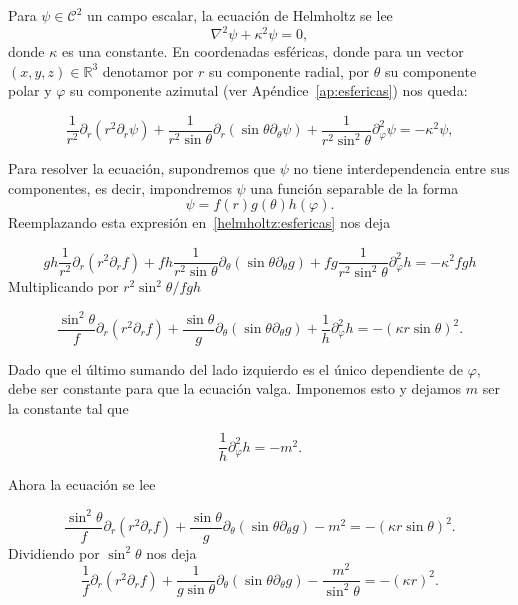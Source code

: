 \documentclass[11pt]{article}
\numberwithin{equation}{section}
\def\R{\mathbb{R}}
\def\Cc{\mathcal{C}}
\begin{document}
Para \(\psi \in \Cc^2\) un campo escalar, la ecuación
de Helmholtz se lee
\begin{equation}
\label{helmholtz}
	\nabla^2 \psi + \kappa^2 \psi = 0
,\end{equation}
donde \(\kappa\) es una constante. En coordenadas esféricas, donde para un
vector \((x,y,z)\in \R^3\) denotamor por \(r\) su componente radial, por 
\(\theta\) su componente polar y \(\varphi\) su componente azimutal 
(ver Apéndice~\ref{ap:esfericas}) nos queda:

\begin{equation}\label{helmholtz:esfericas}
	\frac{1}{r^2} \partial_{r} \left(r^2 \partial_{r} \psi\right)
	+
	\frac{1}{r^2\sin\theta} \partial_{r} \left(\sin\theta \partial_{\theta} \psi\right)
	+
	\frac{1}{r^2\sin^2\theta} \partial^2_{\varphi} \psi
	=
	-\kappa^2 \psi
,\end{equation}

Para resolver la ecuación, supondremos que \(\psi\) no tiene interdependencia
entre sus componentes, es decir, impondremos \(\psi\) una función separable de la forma
\begin{equation}
	\psi = f(r) g(\theta) h(\varphi).
\end{equation}
Reemplazando esta expresión en~\eqref{helmholtz:esfericas} nos deja

\begin{displaymath}
	gh \frac{1}{r^2} \partial_{r} \left(r^2 \partial_{r} f\right)
	+
	fh \frac{1}{r^2 \sin\theta} \partial_{\theta} \left(\sin\theta
	\partial_{\theta} g\right)
	+
	fg \frac{1}{r^2\sin^2\theta} \partial^2_{\varphi} h
	=
	-\kappa^2 fgh
\end{displaymath}
Multiplicando por \(r^2 \sin^2\theta/fgh\)

\begin{displaymath}
	\frac{\sin^2\theta}{f} \partial_{r} \left(r^2 \partial_{r} f\right)
	+
	\frac{\sin\theta}{g} \partial_{\theta} \left(\sin\theta \partial_{\theta} g\right)
	+
	\frac{1}{h} \partial^2_{\varphi} h
	=
	-{(\kappa r \sin\theta)}^2.
\end{displaymath}

Dado que el último sumando del lado izquierdo es el único dependiente de
\(\varphi\), debe ser constante para que la ecuación valga. Imponemos esto y
dejamos \(m\) ser la constante tal que

\[
	\frac{1}{h} \partial^2_{\varphi} h = -m^2.
\]

Ahora la ecuación se lee

\[
	\frac{\sin^2\theta}{f} \partial_{r} \left(r^2 \partial_{r} f\right)
	+
	\frac{\sin\theta}{g} \partial_{\theta} \left(\sin\theta \partial_{\theta} g\right)
	-
	m^2
	=
	-(\kappa r \sin\theta)^2.
\]
Dividiendo por \(\sin^2\theta\) nos deja
\[
	\frac{1}{f} \partial_{r} \left(r^2 \partial_{r} f\right)
	+
	\frac{1}{g\sin\theta} \partial_{\theta} \left(\sin\theta \partial_{\theta} g\right)
	-
	\frac{m^2}{\sin^2\theta}
	=
	-(\kappa r)^2
.\]
\end{document}
